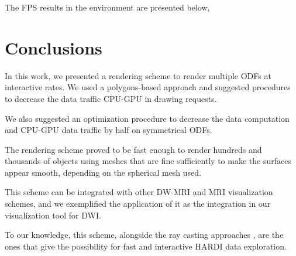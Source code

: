 \documentclass[twoside,twocolumn,10pt]{article}
\begin{document}
The FPS results in the environment are presented below, %












\section{Conclusions}
\label{sec::conclusions}

In this work, we presented a rendering scheme to render multiple ODFs at interactive rates. We used a polygons-based approach and suggested procedures to decrease the data traffic CPU-GPU in drawing requests.

We also suggested an optimization procedure to decrease the data computation and CPU-GPU data traffic by half on symmetrical ODFs.

The rendering scheme proved to be fast enough to render hundreds and thousands of objects using meshes that are fine sufficiently to make the surfaces appear smooth, depending on the spherical mesh used.

This scheme can be integrated with other DW-MRI and MRI visualization schemes, and we exemplified the application of it as the integration in our visualization tool for DWI.

To our knowledge, this scheme, alongside the ray casting approaches \cite{peeters2009,almsick2011}, are the ones that give the possibility for fast and interactive HARDI data exploration.




\end{document}
